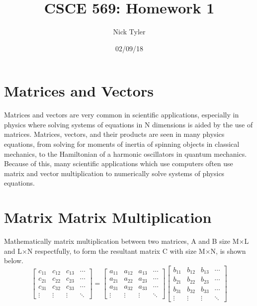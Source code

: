 \documentclass[a4paper]{article}
\title{CSCE 569: Homework 1}
\author{Nick Tyler}
\date{02/09/18}
\begin{document}
\maketitle

\section*{Matrices and Vectors}
Matrices and vectors are very common in scientific applications, especially in physics where solving systems of equations in N dimensions is aided by the use of matrices. Matrices, vectors, and their products are seen in many physics equations, from solving for moments of inertia of spinning objects in classical mechanics, to the Hamiltonian of a harmonic oscillators in quantum mechanics. Because of this, many scientific applications which use computers often use matrix and vector multiplication to numerically solve systems of physics equations.

\section{Matrix Matrix Multiplication}
Mathematically matrix multiplication between two matrices, A and B size M$\times$L and L$\times$N respectfully, to form the resultant matrix C with size M$\times$N, is shown below.
\[
\begin{bmatrix}
    c_{11}  &  c_{12} & c_{13}  & \cdots \\
    c_{21}  &  c_{22} & c_{23}  & \cdots \\
    c_{31}  &  c_{32} & c_{33}  & \cdots \\
    \vdots & \vdots & \vdots & \ddots 
\end{bmatrix} 
=
\begin{bmatrix}
    a_{11}  &  a_{12} & a_{13} & \cdots  \\
    a_{21}  &  a_{22} & a_{23} & \cdots  \\
    a_{31}  &  a_{32} & a_{33} & \cdots  \\
    \vdots & \vdots & \vdots & \ddots 
\end{bmatrix}
\begin{bmatrix}
    b_{11}  &  b_{12} & b_{13} & \cdots  \\
    b_{21}  &  b_{22} & b_{23} & \cdots  \\
    b_{31}  &  b_{32} & b_{33} & \cdots  \\
    \vdots & \vdots & \vdots & \ddots 
\end{bmatrix}
\]
\end{document}
